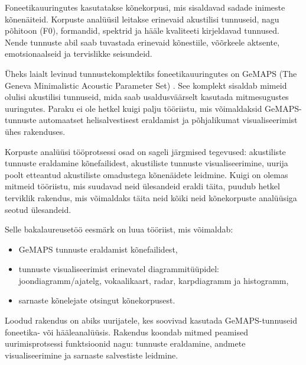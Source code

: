 Foneetikauuringutes kasutatakse kõnekorpusi, mis sisaldavad sadade inimeste kõnenäiteid. Korpuste analüüsil leitakse erinevaid akustilisi tunnuseid, nagu põhitoon (F0), formandid, spektrid ja hääle kvaliteeti kirjeldavad tunnused. Nende tunnuste abil saab tuvastada erinevaid kõnestiile, võõrkeele aktsente, emotsionaalseid ja tervislikke seisundeid.

Üheks laialt levinud tunnustekomplektiks foneetikauuringutes on GeMAPS (The Geneva Minimalistic Acoustic Parameter Set) \cite{eyben2016gemaps}. See komplekt sisaldab mimeid olulisi akustilisi tunnuseid, mida saab usaldusväärselt kasutada mitmesugustes uuringutes. Paraku ei ole hetkel kuigi palju tööriistu, mis võimaldaksid GeMAPS-tunnuste automaatset helisalvestisest eraldamist ja põhjalikumat visualiseerimist ühes rakenduses.

Korpuste analüüsi tööprotsessi osad on sageli järgmised tegevused: akustiliste tunnuste eraldamine kõnefailidest, akustiliste tunnuste visualiseerimine, uurija poolt etteantud akustiliste omadustega kõnenäidete leidmine. Kuigi on olemas mitmeid tööriistu, mis suudavad neid ülesandeid eraldi täita, puudub hetkel terviklik rakendus, mis võimaldaks täita neid kõiki neid kõnekorpuste analüüsiga seotud ülesandeid.

Selle bakalaureusetöö eesmärk on luua tööriist, mis võimaldab:
\begin{itemize}
    \item GeMAPS tunnuste eraldamist kõnefailidest,
    \item tunnuste visualiseerimist erinevatel diagrammitüüpidel: joondiagramm/ajatelg, vokaalikaart, radar, karpdiagramm ja histogramm,
    \item sarnaste kõnelejate otsingut kõnekorpusest.
\end{itemize}

Loodud rakendus on abiks uurijatele, kes soovivad kasutada GeMAPS-tunnuseid foneetika- või hääleanalüüsis. Rakendus koondab mitmed peamised uurimisprotsessi funktsioonid nagu: tunnuste eraldamine, andmete visualiseerimine ja sarnaste salvestiste leidmine.
